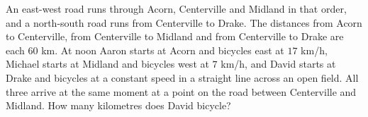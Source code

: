 An east-west road runs through Acorn, Centerville and Midland in that order, and a north-south road runs from Centerville to Drake. The distances from Acorn to Centerville, from Centerville to Midland and from Centerville to Drake are each $60$ km. At noon Aaron starts at Acorn and bicycles east at $17$ km/h, Michael starts at Midland and bicycles west at $7$ km/h, and David starts at Drake and bicycles at a constant speed in a straight line across an open field. All three arrive at the same moment at a point on the road between Centerville and Midland. How many kilometres does David bicycle?
